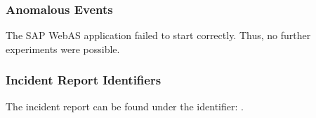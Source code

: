 \subsubsection{Anomalous Events}

The SAP WebAS application failed to start correctly. Thus, no further experiments were possible.

\subsubsection{Incident Report Identifiers}
The incident report can be found under the identifier: .
